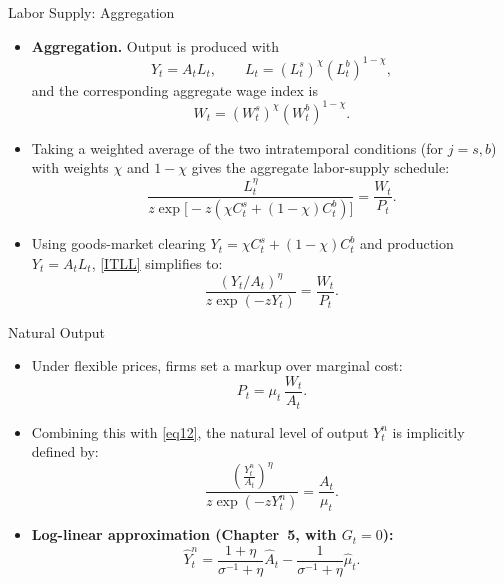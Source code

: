 \documentclass[11pt,aspectratio=169]{beamer}
\begin{document}
\begin{frame}{Labor Supply: Aggregation}
\small
\begin{itemize}
  \item \textbf{Aggregation.} Output is produced with
  \[
    Y_t=A_t L_t,
    \qquad
    L_t=(L_t^s)^\chi (L_t^b)^{1-\chi},
  \]
  and the corresponding aggregate wage index is
  \[
    W_t=(W_t^s)^\chi (W_t^b)^{1-\chi}.
  \]
  \item Taking a weighted average of the two intratemporal conditions (for $j=s,b$) with weights $\chi$ and $1-\chi$ gives the aggregate labor-supply schedule:
  \begin{equation}
    \frac{L_t^\eta}{z\exp\!\big[-z(\chi C_t^s+(1-\chi)C_t^b)\big]}
    =\frac{W_t}{P_t}.
    \label{ITLL}
  \end{equation}

  \item Using goods-market clearing $Y_t=\chi C_t^s+(1-\chi)C_t^b$ and production $Y_t=A_tL_t$, \eqref{ITLL} simplifies to:
  \begin{equation}
    \frac{(Y_t/A_t)^\eta}{z\exp(-zY_t)}=\frac{W_t}{P_t}.
    \label{eq12}
  \end{equation}
\end{itemize}
\end{frame}


\begin{frame}{Natural Output}
\small
\begin{itemize}
  \item Under flexible prices, firms set a markup over marginal cost:
  \[
    P_t=\mu_t\,\frac{W_t}{A_t}.
  \]
  \vspace{0.35em}
  \item Combining this with \eqref{eq12}, the natural level of output $Y_t^n$ is implicitly defined by:
  \[
    \frac{\left(\frac{Y_t^n}{A_t}\right)^{\eta}}{z\exp(-zY_t^n)}
    =\frac{A_t}{\mu_t}.
  \]
  \vspace{0.35em}
  \item \textbf{Log-linear approximation (Chapter~5, with $G_t=0$):}
  \[
    \hat{Y}_t^{n}
    =\frac{1+\eta}{\sigma^{-1}+\eta}\hat{A}_t
    -\frac{1}{\sigma^{-1}+\eta}\hat{\mu}_t.
  \]
\end{itemize}
\end{frame}
\end{document}

